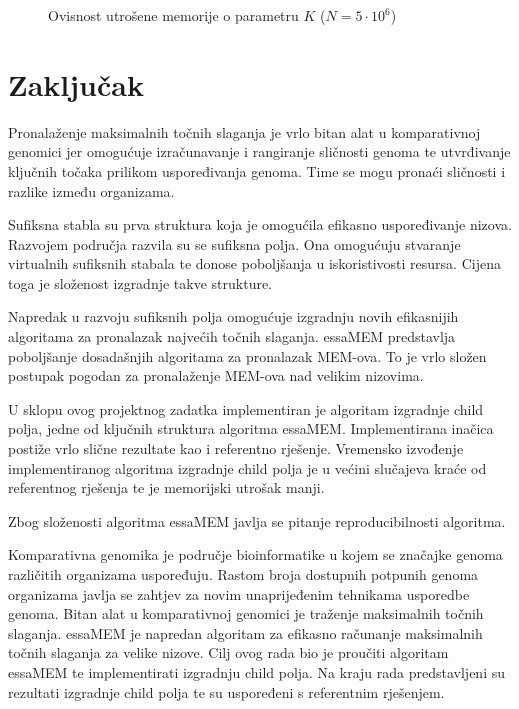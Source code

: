 \documentclass[times, utf8, seminar, numeric]{fer}
\begin{document}
\begin{figure}[!h]
	\centering
	\def\svgwidth{.7\columnwidth}
	
  \caption{Ovisnost utrošene memorije o parametru $K$ ($N = 5 \cdot 10^6$)}
\end{figure}

\chapter{Zaključak}
Pronalaženje maksimalnih točnih slaganja je vrlo bitan alat u komparativnoj genomici jer omogućuje izračunavanje i rangiranje sličnosti genoma te utvrđivanje ključnih točaka prilikom uspoređivanja genoma. Time se mogu pronaći sličnosti i razlike između organizama. 

Sufiksna stabla su prva struktura koja je omogućila efikasno uspoređivanje nizova. Razvojem područja razvila su se sufiksna polja. Ona omogućuju stvaranje virtualnih sufiksnih stabala te donose poboljšanja u iskoristivosti resursa. Cijena toga je složenost izgradnje takve strukture.

Napredak u razvoju sufiksnih polja omogućuje izgradnju novih efikasnijih algoritama za pronalazak najvećih točnih slaganja. essaMEM predstavlja poboljšanje dosadašnjih algoritama za pronalazak MEM-ova. To je vrlo složen postupak pogodan za pronalaženje MEM-ova nad velikim nizovima. 

U sklopu ovog projektnog zadatka implementiran je algoritam izgradnje child polja, jedne od ključnih struktura algoritma essaMEM. Implementirana inačica postiže vrlo slične rezultate kao i referentno rješenje. Vremensko izvođenje implementiranog algoritma izgradnje child polja je u većini slučajeva kraće od referentnog rješenja te je memorijski utrošak manji.

Zbog složenosti algoritma essaMEM javlja se pitanje reproducibilnosti algoritma. 





\begin{sazetak}
Komparativna genomika je područje bioinformatike u kojem se značajke genoma različitih organizama uspoređuju. Rastom broja dostupnih potpunih genoma organizama javlja se zahtjev za novim unaprijeđenim tehnikama usporedbe genoma. Bitan alat u komparativnoj genomici je traženje maksimalnih točnih slaganja. essaMEM je napredan algoritam za efikasno računanje maksimalnih točnih slaganja za velike nizove. Cilj ovog rada bio je proučiti algoritam essaMEM te implementirati izgradnju child polja. Na kraju rada predstavljeni su rezultati izgradnje child polja te su uspoređeni s referentnim rješenjem.

\end{sazetak}
\end{document}
